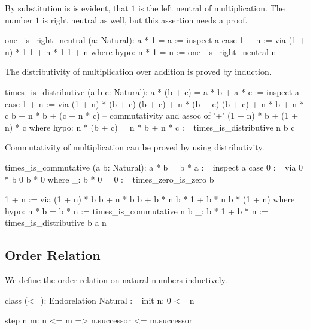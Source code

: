 By substitution is is evident, that $1$ is the left neutral of
multiplication. The number $1$ is right neutral as well, but this assertion
needs a proof.

\begin{alba}
  one_is_right_neutral (a: Natural): a * 1 = a :=
    inspect a case
      1 + n :=
        via
          (1 + n) * 1
          1 + n * 1
          1 + n
        where
          hypo: n * 1 = n := one_is_right_neutral n
\end{alba}


The distributivity of multiplication over addition is proved by induction.
%
\begin{alba}
   times_is_distributive (a b c: Natural): a * (b + c) = a * b + a * c :=
      inspect a case
        1 + n :=
          via
            (1 + n) * (b + c)
            (b + c) + n * (b + c)
            (b + c) + n * b + n * c
            b + n * b + (c + n * c)    -- commutativity and assoc of '+'
            (1 + n) * b + (1 + n) * c
          where
            hypo: n * (b + c) = n * b + n * c :=
              times_is_distributive n b c
\end{alba}


Commutativity of multiplication can be proved by using distributivity.

\begin{alba}
  times_is_commutative (a b: Natural): a * b = b * a :=
    inspect a case
      0 :=
       via 0 * b
           0
           b * 0
       where
         _: b * 0 = 0 := times_zero_is_zero b

      1 + n :=
        via
          (1 + n) * b
          b + n * b
          b + b * n
          b * 1 + b * n
          b * (1 + n)
        where
          hypo: n * b = b * n := times_is_commutative n b
          _: b * 1 + b * n := times_is_distributive b a n
\end{alba}






\subsection{Order Relation}

We define the order relation on natural numbers inductively.

\begin{alba}
    class
        (<=): Endorelation Natural
    :=
        init n:
            0 <= n

        step n m:
            n <= m
            => n.successor <= m.successor
\end{alba}

